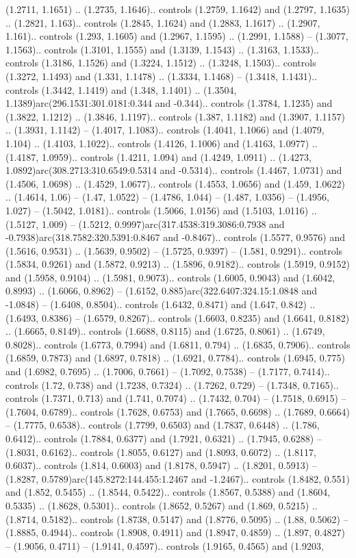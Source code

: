 (1.2711, 1.1651) .. (1.2735, 1.1646).. controls (1.2759, 1.1642) and (1.2797, 1.1635) .. (1.2821, 1.163).. controls (1.2845, 1.1624) and (1.2883, 1.1617) .. (1.2907, 1.161).. controls (1.293, 1.1605) and (1.2967, 1.1595) .. (1.2991, 1.1588) -- (1.3077, 1.1563).. controls (1.3101, 1.1555) and (1.3139, 1.1543) .. (1.3163, 1.1533).. controls (1.3186, 1.1526) and (1.3224, 1.1512) .. (1.3248, 1.1503).. controls (1.3272, 1.1493) and (1.331, 1.1478) .. (1.3334, 1.1468) -- (1.3418, 1.1431).. controls (1.3442, 1.1419) and (1.348, 1.1401) .. (1.3504, 1.1389)arc(296.1531:301.0181:0.344 and -0.344).. controls (1.3784, 1.1235) and (1.3822, 1.1212) .. (1.3846, 1.1197).. controls (1.387, 1.1182) and (1.3907, 1.1157) .. (1.3931, 1.1142) -- (1.4017, 1.1083).. controls (1.4041, 1.1066) and (1.4079, 1.104) .. (1.4103, 1.1022).. controls (1.4126, 1.1006) and (1.4163, 1.0977) .. (1.4187, 1.0959).. controls (1.4211, 1.094) and (1.4249, 1.0911) .. (1.4273, 1.0892)arc(308.2713:310.6549:0.5314 and -0.5314).. controls (1.4467, 1.0731) and (1.4506, 1.0698) .. (1.4529, 1.0677).. controls (1.4553, 1.0656) and (1.459, 1.0622) .. (1.4614, 1.06) -- (1.47, 1.0522) -- (1.4786, 1.044) -- (1.487, 1.0356) -- (1.4956, 1.027) -- (1.5042, 1.0181).. controls (1.5066, 1.0156) and (1.5103, 1.0116) .. (1.5127, 1.009) -- (1.5212, 0.9997)arc(317.4538:319.3086:0.7938 and -0.7938)arc(318.7582:320.5391:0.8467 and -0.8467).. controls (1.5577, 0.9576) and (1.5616, 0.9531) .. (1.5639, 0.9502) -- (1.5725, 0.9397) -- (1.581, 0.9291).. controls (1.5834, 0.9261) and (1.5872, 0.9213) .. (1.5896, 0.9182).. controls (1.5919, 0.9152) and (1.5958, 0.9104) .. (1.5981, 0.9073).. controls (1.6005, 0.9043) and (1.6042, 0.8993) .. (1.6066, 0.8962) -- (1.6152, 0.885)arc(322.6407:324.15:1.0848 and -1.0848) -- (1.6408, 0.8504).. controls (1.6432, 0.8471) and (1.647, 0.842) .. (1.6493, 0.8386) -- (1.6579, 0.8267).. controls (1.6603, 0.8235) and (1.6641, 0.8182) .. (1.6665, 0.8149).. controls (1.6688, 0.8115) and (1.6725, 0.8061) .. (1.6749, 0.8028).. controls (1.6773, 0.7994) and (1.6811, 0.794) .. (1.6835, 0.7906).. controls (1.6859, 0.7873) and (1.6897, 0.7818) .. (1.6921, 0.7784).. controls (1.6945, 0.775) and (1.6982, 0.7695) .. (1.7006, 0.7661) -- (1.7092, 0.7538) -- (1.7177, 0.7414).. controls (1.72, 0.738) and (1.7238, 0.7324) .. (1.7262, 0.729) -- (1.7348, 0.7165).. controls (1.7371, 0.713) and (1.741, 0.7074) .. (1.7432, 0.704) -- (1.7518, 0.6915) -- (1.7604, 0.6789).. controls (1.7628, 0.6753) and (1.7665, 0.6698) .. (1.7689, 0.6664) -- (1.7775, 0.6538).. controls (1.7799, 0.6503) and (1.7837, 0.6448) .. (1.786, 0.6412).. controls (1.7884, 0.6377) and (1.7921, 0.6321) .. (1.7945, 0.6288) -- (1.8031, 0.6162).. controls (1.8055, 0.6127) and (1.8093, 0.6072) .. (1.8117, 0.6037).. controls (1.814, 0.6003) and (1.8178, 0.5947) .. (1.8201, 0.5913) -- (1.8287, 0.5789)arc(145.8272:144.455:1.2467 and -1.2467).. controls (1.8482, 0.551) and (1.852, 0.5455) .. (1.8544, 0.5422).. controls (1.8567, 0.5388) and (1.8604, 0.5335) .. (1.8628, 0.5301).. controls (1.8652, 0.5267) and (1.869, 0.5215) .. (1.8714, 0.5182).. controls (1.8738, 0.5147) and (1.8776, 0.5095) .. (1.88, 0.5062) -- (1.8885, 0.4944).. controls (1.8908, 0.4911) and (1.8947, 0.4859) .. (1.897, 0.4827) -- (1.9056, 0.4711) -- (1.9141, 0.4597).. controls (1.9165, 0.4565) and (1.9203, 
